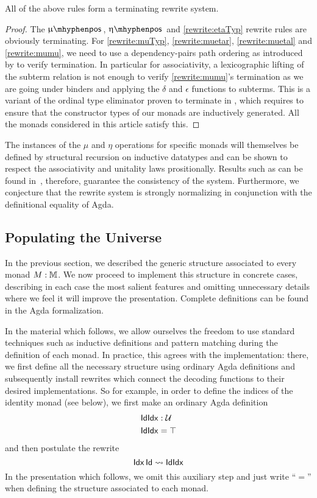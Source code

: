 \vspace{1ex}

\begin{prop}
  All of the above rules form a terminating rewrite system.
\end{prop}
\begin{proof}
  The $\mupos$, $\etapos$ and \eqref{rewrite:etaTyp} rewrite rules are obviously terminating.
  For \eqref{rewrite:muTyp},  \eqref{rewrite:muetar},
  \eqref{rewrite:muetal} and \eqref{rewrite:mumu}, we need to 
  use a dependency-pairs path ordering as introduced by \cite{blanqui19}
  to verify termination. In particular for associativity, a 
  lexicographic lifting of the subterm relation is not 
  enough to verify \eqref{rewrite:mumu}'s termination as we are 
  going under binders and applying the $\delta$ and $\epsilon$ 
  functions to subterms. This is a variant of the ordinal type 
  eliminator proven to terminate in \cite[Example 14, p11]{blanqui19},
  which requires to ensure that the constructor types of our monads 
  are inductively generated. All the monads considered in this article satisfy this.
\end{proof}

The instances of the $\mu$ and $\eta$ operations for specific monads
will themselves be defined by structural recursion on inductive
datatypes and can be shown to respect the associativity and unitality
laws prositionally. Results such as can be found in~\cite[Lemma
6.8]{cockx:hal-02901011}, therefore, guarantee the consistency of the
system.  Furthermore, we conjecture that the rewrite system is
strongly normalizing in conjunction with the definitional equality of
Agda.

\subsection{Populating the Universe}

In the previous section, we described the generic structure
associated to every monad $M : \mathbb{M}$.  We now proceed to implement this
structure in concrete cases, describing in each case the most salient
features and omitting unnecessary details where we feel it will improve
the presentation.  Complete definitions can be found in the Agda
formalization.

In the material which follows, we allow ourselves the freedom to use
standard techniques such as inductive definitions and pattern matching
during the definition of each monad.  In practice, this agrees with
the implementation: there, we first define all the necessary structure
using ordinary Agda definitions and subsequently install rewrites
which connect the decoding functions to their desired implementations.
So for example, in order to define the indices of the identity monad
(see below), we first make an ordinary Agda definition
\begin{align*}
  \mathsf{IdIdx} &: \mathcal{U} \\
  \mathsf{IdIdx} &= \top
\end{align*}
and then postulate the rewrite
\[ \mathsf{Idx}\, \mathsf{Id} \leadsto \mathsf{IdIdx} \]
In the presentation which follows, we omit this auxiliary step
and just write ``$=$'' when defining the structure associated
to each monad.


